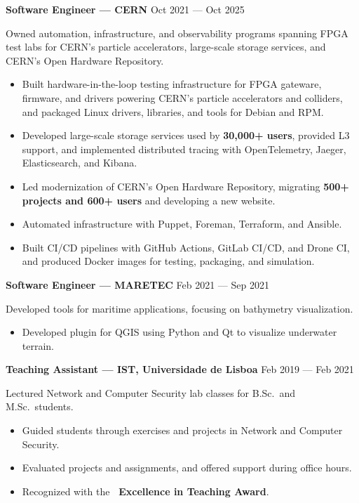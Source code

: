 \documentclass[11pt,a4paper]{article}
\begin{document}
\textbf{Software Engineer --- CERN}
\hfill
Oct 2021 --- Oct 2025

Owned automation, infrastructure, and observability programs spanning FPGA
test labs for CERN's particle accelerators, large-scale storage services, and
CERN's Open Hardware Repository.

\begin{itemize}[noitemsep]
  \item Built hardware-in-the-loop testing infrastructure for FPGA gateware,
  firmware, and drivers powering CERN's particle accelerators and colliders,
  and packaged Linux drivers, libraries, and tools for Debian and RPM\@.
  \item Developed large-scale storage services used by \textbf{30,000+ users},
  provided L3 support, and implemented distributed tracing with OpenTelemetry,
  Jaeger, Elasticsearch, and Kibana.
  \item Led modernization of CERN's Open Hardware Repository, migrating
  \textbf{500+ projects and 600+ users} and developing a new website.
  \item Automated infrastructure with Puppet, Foreman, Terraform, and Ansible.
  \item Built CI/CD pipelines with GitHub Actions, GitLab CI/CD, and Drone CI,
  and produced Docker images for testing, packaging, and simulation.
\end{itemize}

\textbf{Software Engineer --- MARETEC}
\hfill
Feb 2021 --- Sep 2021

Developed tools for maritime applications, focusing on bathymetry visualization.

\begin{itemize}[noitemsep]
  \item Developed plugin for QGIS using Python and Qt to visualize underwater
  terrain.
\end{itemize}

\newpage

\textbf{Teaching Assistant --- IST, Universidade de Lisboa}
\hfill
Feb 2019 --- Feb 2021

Lectured Network and Computer Security lab classes for B.Sc.\ and M.Sc.\
students.

\begin{itemize}[noitemsep]
  \item Guided students through exercises and projects in Network and
  Computer Security.
  \item Evaluated projects and assignments, and offered support during
  office hours.
  \item Recognized with the \textbf{\faAward\ Excellence in Teaching Award}.
\end{itemize}
\end{document}
